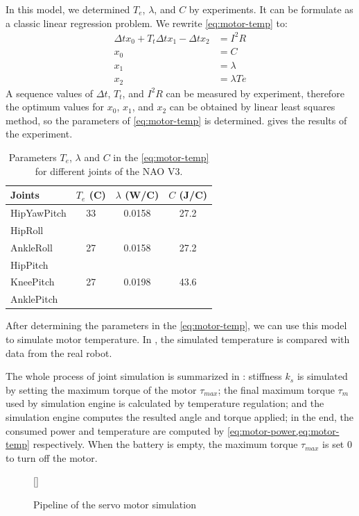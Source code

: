 \documentclass{llncs}
\newcommand{\inputtikz}[1]
{
  \StrSubstitute{#1}{/}{.}[\fn]
  \scancs{\filename}{\fn}
  \tikzsetfigurename{\filename}
  
}
\begin{document}
In this model, we determined $T_e$, $\lambda$, and $C$ by experiments. It can be formulate as a classic linear regression problem. We rewrite \cref{eq:motor-temp} to:
\begin{align}
  \label{eq:motor-temp-ols}
  \Delta{}tx_0 + T_t\Delta{}tx_1 - \Delta{}t x_2 &= I^2R \\
  x_0 &= C \\
  x_1 &= \lambda \\
  x_2 &= \lambda Te
\end{align}
A sequence values of $\Delta{}t$, $T_t$, and $I^2R$ can be measured by experiment, therefore the optimum values for $x_0$, $x_1$, and $x_2$ can be obtained by linear least squares method, so the parameters of \cref{eq:motor-temp} is determined.  gives the results of the experiment.
\begin{table}[h]
  \centering
  \caption{Parameters $T_e$, $\lambda$ and $C$ in the \cref{eq:motor-temp} for different joints of the NAO V3.}
  \label{tab:motor-parameter}
  \begin{tabular}{lccc}
    \toprule
    Joints      & $T_e$ (\textdegree{}C) & $\lambda$ (W/\textdegree{}C) & $C$ (J/\textdegree{}C)\\
    \midrule
    HipYawPitch & 33 & 0.0158 & 27.2 \\
    \midrule
    HipRoll     & & & \\
    AnkleRoll   & 27 & 0.0158 & 27.2 \\
    \midrule
    HipPitch    & & & \\
    KneePitch   & 27 & 0.0198 & 43.6 \\
    AnklePitch  & & & \\
    \bottomrule
  \end{tabular}
\end{table}

After determining the parameters in the \cref{eq:motor-temp}, we can use this model to simulate motor temperature. In , the simulated temperature is compared with data from the real robot.

The whole process of joint simulation is summarized in
: stiffness $k_s$ is simulated by setting the maximum torque
of the motor $\tau_{max}$; the final maximum torque $\tau_m$ used by simulation engine is calculated by temperature regulation; and the simulation engine computes the resulted angle
and torque applied; in the end, the consumed power and temperature are
computed by \cref{eq:motor-power,eq:motor-temp} respectively. When the battery is empty, the maximum torque $\tau_{max}$ is set 0 to turn off the motor.
\begin{figure}
  \centering
  \inputtikz{joint}
  \caption{Pipeline of the servo motor simulation}
  \label{fig:joint}
\end{figure}
\end{document}
